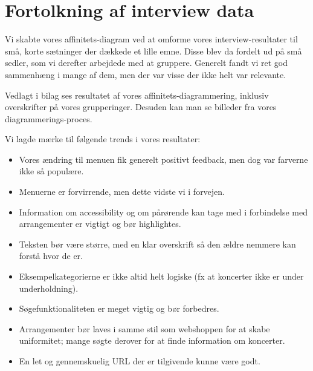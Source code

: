 \section{Fortolkning af interview data}

Vi skabte vores affinitets-diagram ved at omforme vores interview-resultater til små, korte sætninger der dækkede et lille emne. Disse blev da fordelt ud på små sedler, som vi derefter arbejdede med at gruppere.
Generelt fandt vi ret god sammenhæng i mange af dem, men der var visse der ikke helt var relevante.

Vedlagt i bilag ses resultatet af vores affinitets-diagrammering, inklusiv overskrifter på vores grupperinger. Desuden kan man se billeder fra vores diagrammerings-proces.

Vi lagde mærke til følgende trends i vores resultater:

\begin{itemize}
    \item Vores ændring til menuen fik generelt positivt feedback, men dog var farverne ikke så populære.
    \item Menuerne er forvirrende, men dette vidste vi i forvejen.
    \item Information om accessibility og om pårørende kan tage med i forbindelse med arrangementer er vigtigt og bør highlightes.
    \item Teksten bør være større, med en klar overskrift så den ældre nemmere kan forstå hvor de er.
    \item Eksempelkategorierne er ikke altid helt logiske (fx at koncerter ikke er under underholdning).
    \item Søgefunktionaliteten er meget vigtig og bør forbedres.
    \item Arrangementer bør laves i samme stil som webshoppen for at skabe uniformitet; mange søgte derover for at finde information om koncerter.
    \item En let og gennemskuelig URL der er tilgivende kunne være godt.
\end{itemize}
